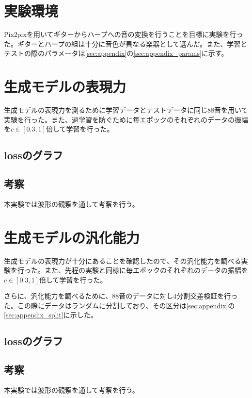 \section{実験環境}

Pix2pixを用いてギターからハープへの音の変換を行うことを目標に実験を行った。ギターとハープの組は十分に音色が異なる楽器として選んだ。また、学習とテストの際のパラメータは\ref{sec:appendix}の\ref{sec:appendix_params}に示す。

\section{生成モデルの表現力}

生成モデルの表現力を測るために学習データとテストデータに同じ88音を用いて実験を行った。また、過学習を防ぐために毎エポックのそれぞれのデータの振幅を$c \in [0.3,1]$倍して学習を行った。

\subsection{lossのグラフ}


\subsection{考察}

本実験では波形の観察を通して考察を行う。


\section{生成モデルの汎化能力}

生成モデルの表現力が十分にあることを確認したので、その汎化能力を調べる実験を行った。また、先程の実験と同様に毎エポックのそれぞれのデータの振幅を$c \in [0.3,1]$倍して学習を行った。

さらに、汎化能力を調べるために、88音のデータに対し4分割交差検証を行った。この際にデータはランダムに分割しており、その区分は\ref{sec:appendix}の\ref{sec:appendix_split}に示した。

\subsection{lossのグラフ}

\subsection{考察}

本実験では波形の観察を通して考察を行う。


